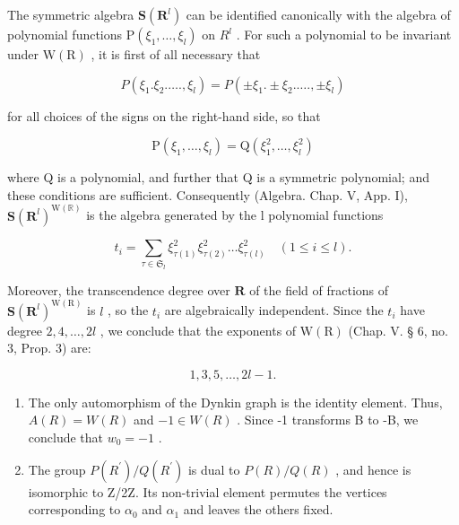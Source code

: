 The symmetric algebra \(\mathbf{S}(\mathbf{R}^{l})\) can be identified canonically with the algebra of polynomial functions \(\mathrm{P}(\xi_{1},\ldots,\xi_{l})\) on \(R^{l}\) . For such a polynomial to be invariant under \(\mathrm{W}(\mathrm{R})\) , it is first of all necessary that

\[
P \left(\xi_ {1}. \xi_ {2}. \dots ., \xi_ {l}\right) = P \left(\pm \xi_ {1}. \pm \xi_ {2}. \dots ., \pm \xi_ {l}\right)
\]

for all choices of the signs on the right-hand side, so that

\[
\mathrm{P} \left(\xi_ {1}, \dots , \xi_ {l}\right) = \mathrm{Q} \left(\xi_ {1} ^ {2}, \dots , \xi_ {l} ^ {2}\right)
\]

where Q is a polynomial, and further that Q is a symmetric polynomial; and these conditions are sufficient. Consequently (Algebra. Chap. V, App. I), \(\mathbf{S}(\mathbf{R}^{l})^{\mathrm{W}(\mathbb{R})}\) is the algebra generated by the l polynomial functions

\[
t _ {i} = \sum_ {\tau \in \mathfrak {S} _ {l}} \xi_ {\tau (1)} ^ {2} \xi_ {\tau (2)} ^ {2} \dots \xi_ {\tau (l)} ^ {2} \quad (1 \leqslant i \leqslant l).
\]

Moreover, the transcendence degree over \(\mathbf{R}\) of the field of fractions of \(\mathbf{S}(\mathbf{R}^l)^{\mathrm{W(R)}}\) is \(l\) , so the \(t_i\) are algebraically independent. Since the \(t_i\) have degree \(2,4,\ldots ,2l\) , we conclude that the exponents of \(\mathrm{W(R)}\) (Chap. V. § 6, no. 3, Prop. 3) are:

\[
1, 3, 5, \dots , 2 l - 1.
\]

\begin{enumerate}
\def\labelenumi{(\Roman{enumi})}
\setcounter{enumi}{10}
\item
  The only automorphism of the Dynkin graph is the identity element. Thus, \(A(R) = W(R)\) and \(-1 \in W(R)\) . Since -1 transforms B to -B, we conclude that \(w_{0} = -1\) .
\item
  The group \(P(R^{\prime})/Q(R^{\prime})\) is dual to \(P(R)/Q(R)\) , and hence is isomorphic to Z/2Z. Its non-trivial element permutes the vertices corresponding to \(\alpha_{0}\) and \(\alpha_{1}\) and leaves the others fixed.
\end{enumerate}
